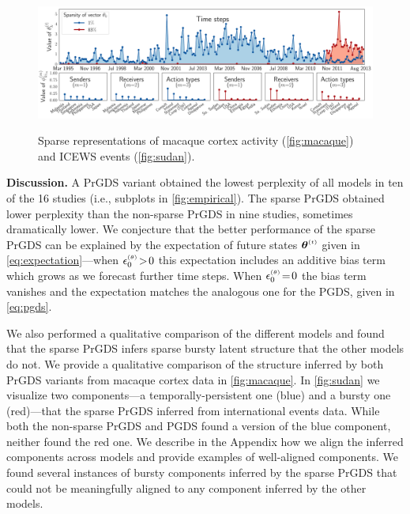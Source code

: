 \documentclass{article}
\begin{document}
\begin{figure}[t]
{
\label{fig:sudan}
\includegraphics[width=\linewidth]{../../fig/components/icews/zero-ordering/double_plots/eps0-components72-0.pdf}
}
% 
\caption{\label{fig:exploratory} Sparse representations of macaque cortex activity (\cref{fig:macaque}) and ICEWS events (\cref{fig:sudan}).}\vspace{-1em}
\end{figure}

\textbf{Discussion.} A PrGDS variant obtained the lowest perplexity of all models in ten of the 16 studies (i.e., subplots in \cref{fig:empirical}). The sparse PrGDS obtained lower perplexity than the non-sparse PrGDS in nine studies, sometimes dramatically lower. We conjecture that the better performance of the sparse PrGDS can be explained by the expectation of future states $\boldsymbol{\theta}^{\mathsmaller{(t)}}$ given in \cref{eq:expectation}---when $\epstheta \!>\! 0$ this expectation includes an additive bias term which grows as we forecast further time steps. When $\epstheta \teq 0$ the bias term vanishes and the expectation matches the analogous one for the PGDS, given in \cref{eq:pgds}.~ 

We also performed a qualitative comparison of the different models and found that the sparse PrGDS infers sparse bursty latent structure that the other models do not. We provide a qualitative comparison of the structure inferred by both PrGDS variants from macaque cortex data in \cref{fig:macaque}. In \cref{fig:sudan} we visualize two components---a temporally-persistent one (blue) and a bursty one (red)---that the sparse PrGDS inferred from international events data. While both the non-sparse PrGDS and PGDS found a version of the blue component, neither found the red one. We describe in the Appendix how we align the inferred components across models and provide examples of well-aligned components. We found several instances of bursty components inferred by the sparse PrGDS that could not be meaningfully aligned to any component inferred by the other models.~
\end{document}
